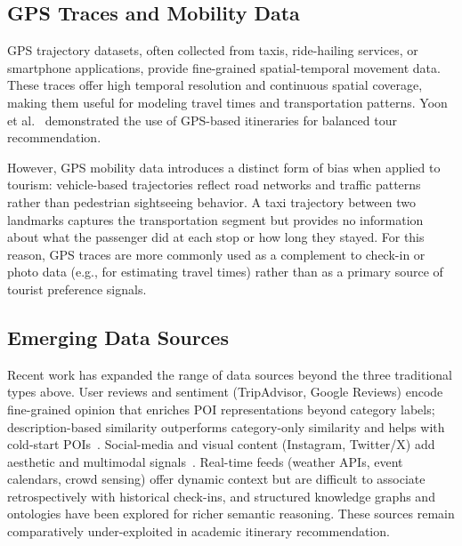\subsection{GPS Traces and Mobility Data}
\label{sec:sota-data-gps}

GPS trajectory datasets, often collected from taxis, ride-hailing services, or smartphone applications, provide fine-grained spatial-temporal movement data. These traces offer high temporal resolution and continuous spatial coverage, making them useful for modeling travel times and transportation patterns. Yoon et al.~\cite{yoon2016gps} demonstrated the use of GPS-based itineraries for balanced tour recommendation.

However, GPS mobility data introduces a distinct form of bias when applied to tourism: vehicle-based trajectories reflect road networks and traffic patterns rather than pedestrian sightseeing behavior. A taxi trajectory between two landmarks captures the transportation segment but provides no information about what the passenger did at each stop or how long they stayed. For this reason, GPS traces are more commonly used as a complement to check-in or photo data (e.g., for estimating travel times) rather than as a primary source of tourist preference signals.

\subsection{Emerging Data Sources}
\label{sec:sota-data-emerging}

Recent work has expanded the range of data sources beyond the three traditional types above. User reviews and sentiment (TripAdvisor, Google Reviews) encode fine-grained opinion that enriches POI representations beyond category labels; description-based similarity outperforms category-only similarity and helps with cold-start POIs~\cite{chen2019description}. Social-media and visual content (Instagram, Twitter/X) add aesthetic and multimodal signals~\cite{wang2018vpoi}. Real-time feeds (weather APIs, event calendars, crowd sensing) offer dynamic context but are difficult to associate retrospectively with historical check-ins, and structured knowledge graphs and ontologies have been explored for richer semantic reasoning. These sources remain comparatively under-exploited in academic itinerary recommendation.

